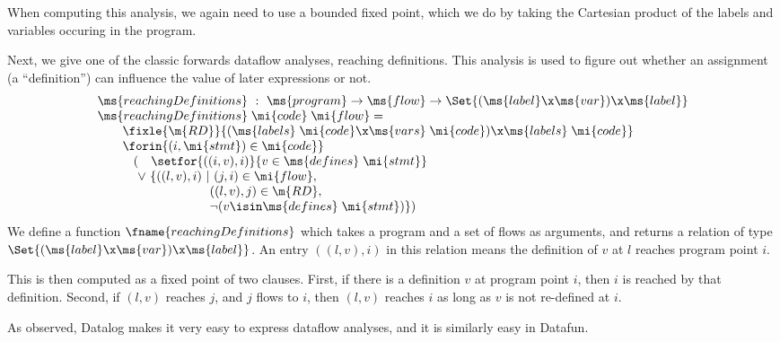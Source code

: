 When computing this analysis, we again need to use a bounded fixed
point, which we do by taking the Cartesian product of the labels and
variables occuring in the program.


Next, we give one of the classic forwards dataflow analyses,
reaching definitions. This analysis is used to figure out whether
an assignment (a ``definition'') can influence the value of later
expressions or not.
\[\begin{array}{l}
\ms{reachingDefinitions} ~:~ \ms{program} \uto \ms{flow}
\uto \Set{(\ms{label} \x \ms{var}) \x \ms{label}}\\
\ms{reachingDefinitions} \;\mi{code} \;\mi{flow} =\\
\hspace{2em}\fixle{\m{RD}}{%
  (\ms{labels}\;\mi{code} \x \ms{vars}\;\mi{code}) \x \ms{labels}\;\mi{code} }\\
\hspace{2em}\forin{(i,\mi{stmt}) \in \mi{code}}\\
\hspace{2.875em} (
\phantom{\vee~}\setfor{((i,v), i)}{v \in \ms{defines}\;\mi{stmt}}\\
\hspace{3.2em} \vee~ \{((l,v), i) ~|~ (j,i) \in \mi{flow},\\
\hspace{8.95em}((l,v), j) \in \m{RD},\\
\hspace{8.95em}\neg(v \isin \ms{defines}\;\mi{stmt})\})
\end{array}\]
We define a function $\fname{reachingDefinitions}$ which takes a
program and a set of flows as arguments, and returns a relation of
type $\Set{(\ms{label} \x \ms{var}) \x \ms{label}}$. An entry $((l,v),
i)$ in this relation means the definition of $v$ at $l$ reaches program
point $i$.

This is then computed as a fixed point of two clauses. First, if there
is a definition $v$ at program point $i$, then $i$ is reached by that
definition. Second, if $(l,v)$ reaches $j$, and $j$ flows to $i$, then
$(l,v)$ reaches $i$ as long as $v$ is not re-defined at $i$.

As \citet{whaley-lam} observed, Datalog makes it very easy to express
dataflow analyses, and it is similarly easy in Datafun.
